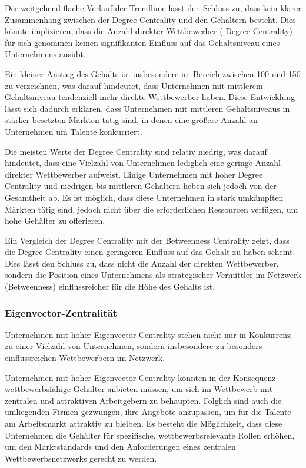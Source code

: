 \documentclass[
]{article}
\begin{document}
Der weitgehend flache Verlauf der Trendlinie lässt den Schluss zu, dass
kein klarer Zusammenhang zwischen der Degree Centrality und den
Gehältern besteht. Dies könnte implizieren, dass die Anzahl direkter
Wettbewerber ( Degree Centrality) für sich genommen keinen signifikanten
Einfluss auf das Gehaltsniveau eines Unternehmens ausübt.

Ein kleiner Anstieg des Gehalts ist insbesondere im Bereich zwischen 100
und 150 zu verzeichnen, was darauf hindeutet, dass Unternehmen mit
mittlerem Gehaltsniveau tendenziell mehr direkte Wettbewerber haben.
Diese Entwicklung lässt sich dadurch erklären, dass Unternehmen mit
mittleren Gehaltsniveaus in stärker besetzten Märkten tätig sind, in
denen eine größere Anzahl an Unternehmen um Talente konkurriert.

Die meisten Werte der Degree Centrality sind relativ niedrig, was darauf
hindeutet, dass eine Vielzahl von Unternehmen lediglich eine geringe
Anzahl direkter Wettbewerber aufweist. Einige Unternehmen mit hoher
Degree Centrality und niedrigen bis mittleren Gehältern heben sich
jedoch von der Gesamtheit ab. Es ist möglich, dass diese Unternehmen in
stark umkämpften Märkten tätig sind, jedoch nicht über die
erforderlichen Ressourcen verfügen, um hohe Gehälter zu offerieren.

Ein Vergleich der Degree Centrality mit der Betweenness Centrality
zeigt, dass die Degree Centrality einen geringeren Einfluss auf das
Gehalt zu haben scheint. Dies lässt den Schluss zu, dass nicht die
Anzahl der direkten Wettbewerber, sondern die Position eines
Unternehmens als strategischer Vermittler im Netzwerk (Betweenness)
einflussreicher für die Höhe des Gehalts ist.

\subsubsection{Eigenvector-Zentralität}\label{eigenvector-zentralituxe4t}

Unternehmen mit hoher Eigenvector Centrality stehen nicht nur in
Konkurrenz zu einer Vielzahl von Unternehmen, sondern insbesondere zu
besonders einflussreichen Wettbewerbern im Netzwerk.

Unternehmen mit hoher Eigenvector Centrality könnten in der Konsequenz
wettbewerbsfähige Gehälter anbieten müssen, um sich im Wettbewerb mit
zentralen und attraktiven Arbeitgebern zu behaupten. Folglich sind auch
die umliegenden Firmen gezwungen, ihre Angebote anzupassen, um für die
Talente am Arbeitsmarkt attraktiv zu bleiben. Es besteht die
Möglichkeit, dass diese Unternehmen die Gehälter für spezifische,
wettbewerbsrelevante Rollen erhöhen, um den Marktstandards und den
Anforderungen eines zentralen Wettbewerbsnetzwerks gerecht zu werden.
\end{document}
